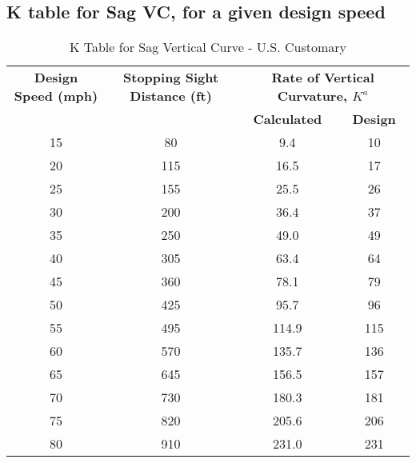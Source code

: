 \documentclass{article}
\begin{document}
  \subsection{K table for Sag VC, for a given design speed}
  \begin{table}[h!]
    \centering
    \begin{tabular}{|c|c|c|c|}
    \hline
    \textbf{Design Speed (mph)} & \textbf{Stopping Sight Distance (ft)} & \multicolumn{2}{c|}{\textbf{Rate of Vertical Curvature, $K^a$}} \\ \cline{3-4} 
                                &                                       & \textbf{Calculated} & \textbf{Design} \\ \hline
    15                          & 80                                    & 9.4                 & 10              \\ \hline
    20                          & 115                                   & 16.5                & 17              \\ \hline
    25                          & 155                                   & 25.5                & 26              \\ \hline
    30                          & 200                                   & 36.4                & 37              \\ \hline
    35                          & 250                                   & 49.0                & 49              \\ \hline
    40                          & 305                                   & 63.4                & 64              \\ \hline
    45                          & 360                                   & 78.1                & 79              \\ \hline
    50                          & 425                                   & 95.7                & 96              \\ \hline
    55                          & 495                                   & 114.9               & 115             \\ \hline
    60                          & 570                                   & 135.7               & 136             \\ \hline
    65                          & 645                                   & 156.5               & 157             \\ \hline
    70                          & 730                                   & 180.3               & 181             \\ \hline
    75                          & 820                                   & 205.6               & 206             \\ \hline
    80                          & 910                                   & 231.0               & 231             \\ \hline
    \end{tabular}
    \caption{K Table for Sag Vertical Curve - U.S. Customary}
    \end{table}
    
\end{document}
